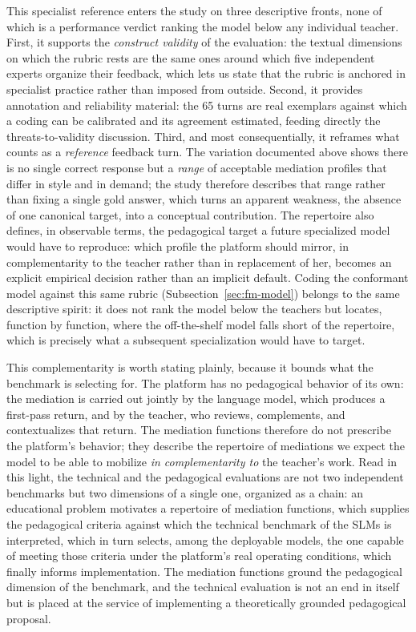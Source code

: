 \documentclass{sbc2023}%
\begin{document}
This specialist reference enters the study on three descriptive fronts, none of which is a performance verdict ranking the model below any individual teacher. First, it supports the \textit{construct validity} of the evaluation: the textual dimensions on which the rubric rests are the same ones around which five independent experts organize their feedback, which lets us state that the rubric is anchored in specialist practice rather than imposed from outside. Second, it provides annotation and reliability material: the 65 turns are real exemplars against which a coding can be calibrated and its agreement estimated, feeding directly the threats-to-validity discussion. Third, and most consequentially, it reframes what counts as a \textit{reference} feedback turn. The variation documented above shows there is no single correct response but a \textit{range} of acceptable mediation profiles that differ in style and in demand; the study therefore describes that range rather than fixing a single gold answer, which turns an apparent weakness, the absence of one canonical target, into a conceptual contribution. The repertoire also defines, in observable terms, the pedagogical target a future specialized model would have to reproduce: which profile the platform should mirror, in complementarity to the teacher rather than in replacement of her, becomes an explicit empirical decision rather than an implicit default. Coding the conformant model against this same rubric (Subsection~\ref{sec:fm-model}) belongs to the same descriptive spirit: it does not rank the model below the teachers but locates, function by function, where the off-the-shelf model falls short of the repertoire, which is precisely what a subsequent specialization would have to target.

This complementarity is worth stating plainly, because it bounds what the benchmark is selecting for. The platform has no pedagogical behavior of its own: the mediation is carried out jointly by the language model, which produces a first-pass return, and by the teacher, who reviews, complements, and contextualizes that return. The mediation functions therefore do not prescribe the platform's behavior; they describe the repertoire of mediations we expect the model to be able to mobilize \textit{in complementarity to} the teacher's work. Read in this light, the technical and the pedagogical evaluations are not two independent benchmarks but two dimensions of a single one, organized as a chain: an educational problem motivates a repertoire of mediation functions, which supplies the pedagogical criteria against which the technical benchmark of the SLMs is interpreted, which in turn selects, among the deployable models, the one capable of meeting those criteria under the platform's real operating conditions, which finally informs implementation. The mediation functions ground the pedagogical dimension of the benchmark, and the technical evaluation is not an end in itself but is placed at the service of implementing a theoretically grounded pedagogical proposal.
\end{document}
